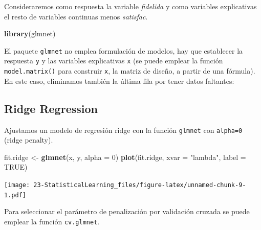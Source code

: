 \documentclass[]{book}
\newenvironment{Shaded}{\begin{snugshade}}{\end{snugshade}}
\newcommand{\KeywordTok}[1]{\textcolor[rgb]{0.13,0.29,0.53}{\textbf{#1}}}
\newcommand{\DataTypeTok}[1]{\textcolor[rgb]{0.13,0.29,0.53}{#1}}
\newcommand{\DecValTok}[1]{\textcolor[rgb]{0.00,0.00,0.81}{#1}}
\newcommand{\StringTok}[1]{\textcolor[rgb]{0.31,0.60,0.02}{#1}}
\newcommand{\OtherTok}[1]{\textcolor[rgb]{0.56,0.35,0.01}{#1}}
\newcommand{\OperatorTok}[1]{\textcolor[rgb]{0.81,0.36,0.00}{\textbf{#1}}}
\newcommand{\NormalTok}[1]{#1}
\begin{document}
Consideraremos como respuesta la variable \emph{fidelida} y como
variables explicativas el resto de variables continuas menos
\emph{satisfac}.

\begin{Shaded}
\begin{Highlighting}[]
\KeywordTok{library}\NormalTok{(glmnet)}
\end{Highlighting}
\end{Shaded}

El paquete \texttt{glmnet} no emplea formulación de modelos, hay que
establecer la respuesta \texttt{y} y las variables explicativas
\texttt{x} (se puede emplear la función \texttt{model.matrix()} para
construir \texttt{x}, la matriz de diseño, a partir de una fórmula). En
este caso, eliminamos también la última fila por tener datos faltantes:

\begin{Shaded}
\end{Shaded}

\subsection{Ridge Regression}\label{ridge-regression}

Ajustamos un modelo de regresión ridge con la función \texttt{glmnet}
con \texttt{alpha=0} (ridge penalty).

\begin{Shaded}
\begin{Highlighting}[]
\NormalTok{fit.ridge <-}\StringTok{ }\KeywordTok{glmnet}\NormalTok{(x, y, }\DataTypeTok{alpha =} \DecValTok{0}\NormalTok{)}
\KeywordTok{plot}\NormalTok{(fit.ridge, }\DataTypeTok{xvar =} \StringTok{"lambda"}\NormalTok{, }\DataTypeTok{label =} \OtherTok{TRUE}\NormalTok{)}
\end{Highlighting}
\end{Shaded}

\texttt{[image: 23-StatisticalLearning\_files/figure-latex/unnamed-chunk-9-1.pdf]}

Para seleccionar el parámetro de penalización por validación cruzada se
puede emplear la función \texttt{cv.glmnet}.
\end{document}
